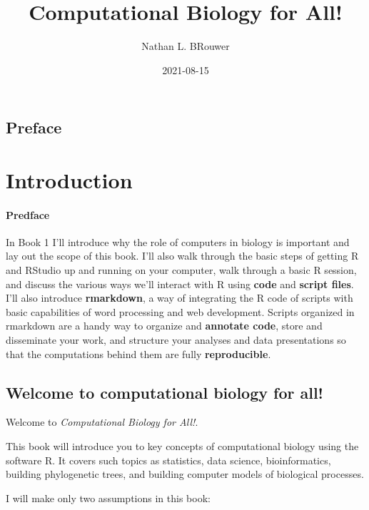 \documentclass[
]{book}
\title{Computational Biology for All!}
\author{Nathan L. BRouwer}
\date{2021-08-15}
\begin{document}
\maketitle

{
\setcounter{tocdepth}{1}
\tableofcontents
}
\hypertarget{preface}{%
\chapter*{Preface}\label{preface}}

\hypertarget{part-introduction}{%
\part{Introduction}\label{part-introduction}}

\hypertarget{predface}{%
\subsection*{Predface}\label{predface}}

In Book 1 I'll introduce why the role of computers in biology is important and lay out the scope of this book. I'll also walk through the basic steps of getting R and RStudio up and running on your computer, walk through a basic R session, and discuss the various ways we'll interact with R using \textbf{code} and \textbf{script files}. I'll also introduce \textbf{rmarkdown}, a way of integrating the R code of scripts with basic capabilities of word processing and web development. Scripts organized in rmarkdown are a handy way to organize and \textbf{annotate code}, store and disseminate your work, and structure your analyses and data presentations so that the computations behind them are fully \textbf{reproducible}.

\hypertarget{intro}{%
\chapter{Welcome to computational biology for all!}\label{intro}}

Welcome to \emph{Computational Biology for All!}.

This book will introduce you to key concepts of computational biology using the software R. It covers such topics as statistics, data science, bioinformatics, building phylogenetic trees, and building computer models of biological processes.

I will make only two assumptions in this book:
\end{document}
